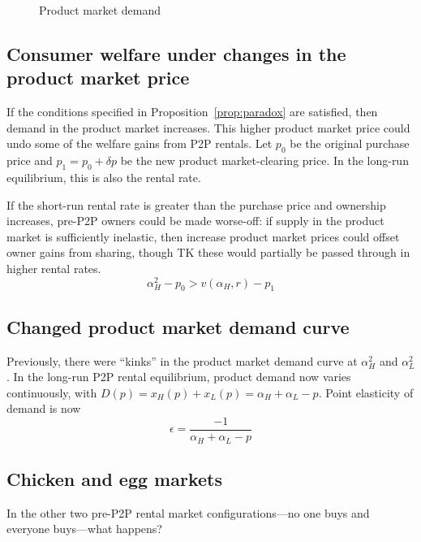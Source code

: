 \documentclass[11pt]{article}
\begin{document}
\begin{figure}
\caption{Product market demand}
\label{fig:demand} 
\begin{center}
\end{center}
\end{figure} 


\subsection{Consumer welfare under changes in the product market price} 
If the conditions specified in Proposition~\ref{prop:paradox} are satisfied, then demand in the product market increases. 
This higher product market price could undo some of the welfare gains from P2P rentals. 
Let $p_0$ be the original purchase price and $p_1 = p_0 + \delta p$ be the new product market-clearing price. 
In the long-run equilibrium, this is also the rental rate. 
 

If the short-run rental rate is greater than the purchase price and ownership increases, pre-P2P owners could be made worse-off: if supply in the product market is sufficiently inelastic, then increase product market prices could offset owner gains from sharing, though TK these would partially be passed through in higher rental rates. 
\begin{equation}
\alpha_H^2 - p_0 > v(\alpha_H, r) - p_1 
\end{equation} 

\subsection{Changed product market demand curve} 
Previously, there were ``kinks'' in the product market demand curve at $\alpha_H^2$ and $\alpha_L^2$. 
In the long-run P2P rental equilibrium, product demand now varies continuously, with $D(p) = x_H(p) + x_L(p) = \alpha_H + \alpha_L - p$. 
Point elasticity of demand is now 
\begin{equation}
\epsilon = \frac{-1}{\alpha_H + \alpha_L - p} 
\end{equation} 

\subsection{Chicken and egg markets}
In the other two pre-P2P rental market configurations---no one buys and everyone buys---what happens? 
\end{document}
